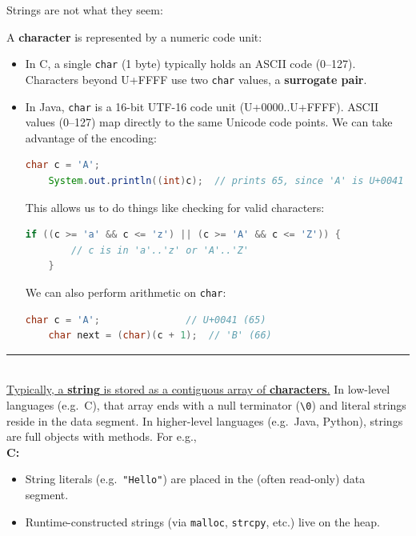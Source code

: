 \noindent
Strings are not what they seem:
\begin{Def}

    \noindent
    A \textbf{character} is represented by a numeric code unit:
    \begin{itemize}
      \item In C, a single \texttt{char} (1 byte) typically holds an ASCII code (0--127). Characters beyond U+FFFF use two \texttt{char} values, a \textbf{surrogate pair}.
      \item In Java, \texttt{char} is a 16-bit UTF-16 code unit (U+0000..U+FFFF). ASCII values (0--127) map directly to the same Unicode code points. We can take advantage of the encoding:
      
    \begin{lstlisting}[language=Java]
    char c = 'A';
    System.out.println((int)c);  // prints 65, since 'A' is U+0041
    \end{lstlisting}
      
      \noindent
      This allows us to do things like checking for 
      valid characters:
    \begin{lstlisting}[language=Java]
    if ((c >= 'a' && c <= 'z') || (c >= 'A' && c <= 'Z')) {
        // c is in 'a'..'z' or 'A'..'Z'
    }
    \end{lstlisting}

    \noindent
    We can also perform arithmetic on \texttt{char}:
    \begin{lstlisting}[language=Java]
    char c = 'A';               // U+0041 (65)
    char next = (char)(c + 1);  // 'B' (66)
    \end{lstlisting}
    \end{itemize}
    
    \noindent
    \rule{\textwidth}{0.4pt}\\ 

    \noindent
    \underline{Typically, a \textbf{string} is stored as a contiguous array of \textbf{characters}.} In low-level languages (e.g.\ C),
    that array ends with a null terminator (\verb|\0|) and literal strings reside in the data segment. 
    In higher-level languages (e.g.\ Java, Python), strings are full objects with methods. For e.g.,\\

    \noindent
    \textbf{C:}  
    \begin{itemize}
      \item String literals (e.g.\ \texttt{"Hello"}) are placed in the (often read-only) data segment.
      \item Runtime-constructed strings (via \texttt{malloc}, \texttt{strcpy}, etc.) live on the heap.
    \end{itemize}


\end{Def}
